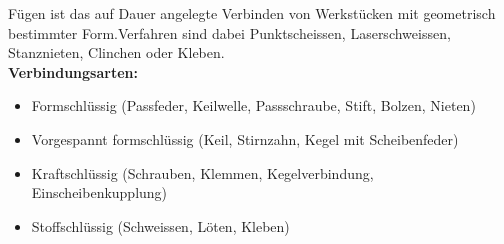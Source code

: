 Fügen ist das auf Dauer angelegte Verbinden von Werkstücken mit 
geometrisch bestimmter Form.Verfahren sind dabei Punktscheissen, 
Laserschweissen, Stanznieten, Clinchen oder Kleben.\\

\textbf{Verbindungsarten:} 
\begin{itemize}
    \item Formschlüssig (Passfeder, Keilwelle, Passschraube, Stift, Bolzen, Nieten)
    \item Vorgespannt formschlüssig (Keil, Stirnzahn, Kegel mit Scheibenfeder)
    \item Kraftschlüssig (Schrauben, Klemmen, Kegelverbindung, Einscheibenkupplung)
    \item Stoffschlüssig (Schweissen, Löten, Kleben)
\end{itemize}
